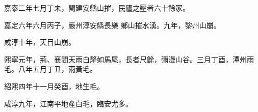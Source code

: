 \begin{pinyinscope}
 嘉泰二年七月丁未，閩建安縣山摧，民廬之壓者六十餘家。



 嘉定六年六月丙子，嚴州淳安縣長樂
 鄉山摧水湧。九年，黎州山崩。



 咸淳十年，天目山崩。



 熙寧元年，荊、襄間天雨白犛如馬尾，長者尺餘，彌漫山谷。三月丁酉，潭州雨毛。八年五月丁丑，雨黃毛。



 紹熙四年十一月癸酉，地生毛。



 咸淳九年，江南平地產白毛，臨安尤多。



\end{pinyinscope}